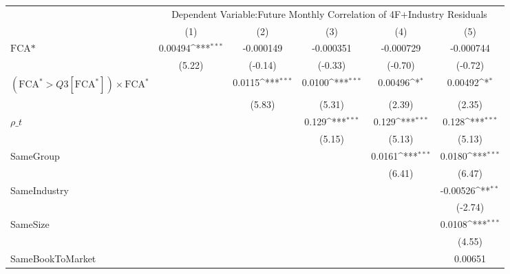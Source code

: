 {
\def\sym#1{\ifmmode^{#1}\else\(^{#1}\)\fi}
\begin{tabular}{l*{5}{c}}
\hline\hline
                &\multicolumn{5}{c}{Dependent Variable:Future Monthly Correlation of 4F+Industry Residuals}    \\\cmidrule(lr){2-6}
                &\multicolumn{1}{c}{(1)}         &\multicolumn{1}{c}{(2)}         &\multicolumn{1}{c}{(3)}         &\multicolumn{1}{c}{(4)}         &\multicolumn{1}{c}{(5)}         \\
\hline
$ \text{FCA*} $ &  0.00494\sym{***}&-0.000149         &-0.000351         &-0.000729         &-0.000744         \\
                &   (5.22)         &  (-0.14)         &  (-0.33)         &  (-0.70)         &  (-0.72)         \\
[1em]
 $ (\text{FCA}^* > Q3[\text{FCA}^*]) \times {\text{FCA} ^*}  $ &                  &   0.0115\sym{***}&   0.0100\sym{***}&  0.00496\sym{*}  &  0.00492\sym{*}  \\
                &                  &   (5.83)         &   (5.31)         &   (2.39)         &   (2.35)         \\
[1em]
 $ {\rho\_t} $   &                  &                  &    0.129\sym{***}&    0.129\sym{***}&    0.128\sym{***}\\
                &                  &                  &   (5.15)         &   (5.13)         &   (5.13)         \\
[1em]
SameGroup       &                  &                  &                  &   0.0161\sym{***}&   0.0180\sym{***}\\
                &                  &                  &                  &   (6.41)         &   (6.47)         \\
[1em]
SameIndustry    &                  &                  &                  &                  & -0.00526\sym{**} \\
                &                  &                  &                  &                  &  (-2.74)         \\
[1em]
SameSize        &                  &                  &                  &                  &   0.0108\sym{***}\\
                &                  &                  &                  &                  &   (4.55)         \\
[1em]
SameBookToMarket&                  &                  &                  &                  &  0.00651         \\

\end{tabular}}
